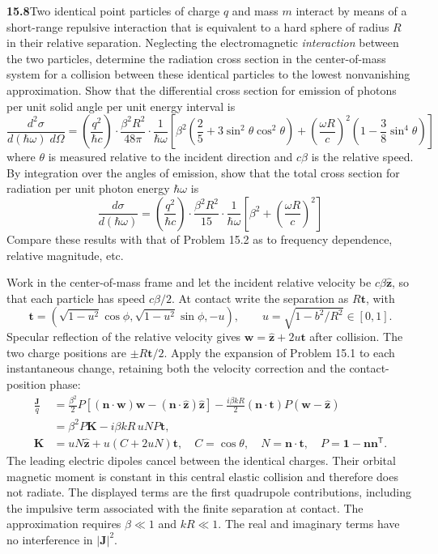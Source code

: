 \par\bigskip
\noindent\textbf{15.8}\quad Two identical point particles of charge $q$ and mass $m$ interact by means of a short-range repulsive interaction that is equivalent to a hard sphere of radius $R$ in their relative separation. Neglecting the electromagnetic \emph{interaction} between the two particles, determine the radiation cross section in the center-of-mass system for a collision between these identical particles to the lowest nonvanishing approximation. Show that the differential cross section for emission of photons per unit solid angle per unit energy interval is
\[
\frac{d^{2}\sigma}{d(\hbar\omega)\;d\Omega}=\left(\frac{q^{2}}{\hbar c}\right)\cdot\frac{\beta^{2}R^{2}}{48\pi}\cdot\frac{1}{\hbar\omega}\left[\beta^{2}\!\left(\frac{2}{5}+3\sin^{2}\theta\cos^{2}\theta\right)+\left(\frac{\omega R}{c}\right)^{2}\!\left(1-\frac{3}{8}\sin^{4}\theta\right)\right]
\]
where $\theta$ is measured relative to the incident direction and $c\beta$ is the relative speed. By integration over the angles of emission, show that the total cross section for radiation per unit photon energy $\hbar\omega$ is
\[
\frac{d\sigma}{d(\hbar\omega)}=\left(\frac{q^{2}}{\hbar c}\right)\cdot\frac{\beta^{2}R^{2}}{15}\cdot\frac{1}{\hbar\omega}\left[\beta^{2}+\left(\frac{\omega R}{c}\right)^{2}\right]
\]
Compare these results with that of Problem 15.2 as to frequency dependence, relative magnitude, etc.
\solution

Work in the center-of-mass frame and let the incident relative
velocity be $c\beta\widehat{\mathbf z}$, so that each particle has
speed $c\beta/2$.  At contact write the separation as $R\mathbf t$,
with
\[
\mathbf t=(\sqrt{1-u^2}\cos\phi,\sqrt{1-u^2}\sin\phi,-u),
\qquad u=\sqrt{1-b^2/R^2}\in[0,1].
\]
Specular reflection of the relative velocity gives
$\mathbf w=\widehat{\mathbf z}+2u\mathbf t$ after collision.
The two charge positions are $\pm R\mathbf t/2$.  Apply the
expansion of Problem 15.1 to each instantaneous change, retaining
both the velocity correction and the contact-position phase:
\begin{align*}
\frac{\mathbf J}{q}
&=\frac{\beta^2}{2}P[(\mathbf n\cdot\mathbf w)\mathbf w
 -(\mathbf n\cdot\widehat{\mathbf z})\widehat{\mathbf z}]
 -\frac{i\beta kR}{2}(\mathbf n\cdot\mathbf t)
 P(\mathbf w-\widehat{\mathbf z})\\
&=\beta^2P\mathbf K-i\beta kR\,uN P\mathbf t,\\
\mathbf K&=uN\widehat{\mathbf z}+u(C+2uN)\mathbf t,
\quad C=\cos\theta,\quad N=\mathbf n\cdot\mathbf t,
\quad P=\mathbf1-\mathbf n\mathbf n^{\mathsf T}.
\end{align*}
The leading electric dipoles cancel between the identical charges.
Their orbital magnetic moment is constant in this central elastic
collision and therefore does not radiate.  The displayed terms are
the first quadrupole contributions, including the impulsive term
associated with the finite separation at contact.  The approximation
requires $\beta\ll1$ and $kR\ll1$.  The real and imaginary terms
have no interference in $|\mathbf J|^2$.

